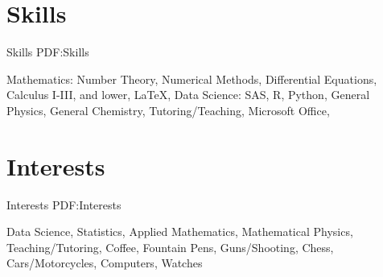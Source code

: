 \documentclass[letterpaper,10pt,oneside]{article}
\begin{document}
\begin{body}
\begin{comment}
\section
{Professional Affiliations\newline}
{Professional Affiliations}
{PDF:ProfessionalAffiliations}

{\textbf{Phi Theta Kappa Honor Society}},
Virginia, USA

\GapNoBreak
\BulletItem
Member
\hfill
\DatestampY{2015} --
Present

\end{comment}

\section
{Skills}
{Skills}
{PDF:Skills}

{Mathematics: Number Theory, Numerical Methods, Differential Equations, Calculus I-III, and lower}, {\LaTeX}, {Data Science: SAS, R, Python}, {General Physics}, {General Chemistry}, {Tutoring/Teaching}, {Microsoft Office},     

\section
{Interests}
{Interests}
{PDF:Interests}

Data Science,
Statistics,
Applied Mathematics,
Mathematical Physics,
Teaching/Tutoring,
Coffee, 
Fountain Pens, 
Guns/Shooting, 
Chess, 
Cars/Motorcycles, 
Computers, 
Watches


\end{body}

\label{LastPage}~
\end{document}

